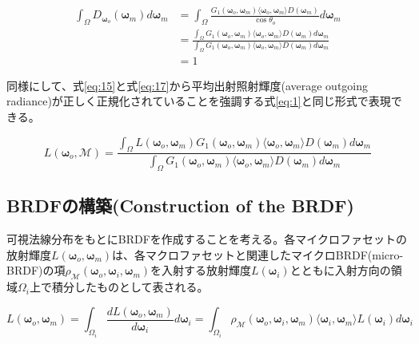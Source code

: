 \documentclass[a4j,xelatex,ja=standard]{bxjsarticle}
\begin{document}
\begin{equation}
    \begin{split}
        \int_\Omega D_{\boldsymbol{\omega}_o}(\boldsymbol{\omega}_m) d\boldsymbol{\omega}_m
        &= \int_\Omega \frac{G_1(\boldsymbol{\omega}_o, \boldsymbol{\omega}_m) \langle \boldsymbol{\omega}_o, \boldsymbol{\omega}_m \rangle D(\boldsymbol{\omega}_m)}{\cos\theta_o} d\boldsymbol{\omega}_m \\
        &= \frac{\int_\Omega G_1(\boldsymbol{\omega}_o, \boldsymbol{\omega}_m) \langle \boldsymbol{\omega}_o, \boldsymbol{\omega}_m \rangle D(\boldsymbol{\omega}_m) d\boldsymbol{\omega}_m}{\int_\Omega G_1(\boldsymbol{\omega}_o, \boldsymbol{\omega}_m) \langle \boldsymbol{\omega}_o, \boldsymbol{\omega}_m \rangle D(\boldsymbol{\omega}_m)d \boldsymbol{\omega}_m} \\
        &= 1
    \end{split}
    \label{eq:18}
\end{equation}

同様にして、式\eqref{eq:15}と式\eqref{eq:17}から平均出射照射輝度(average outgoing radiance)が正しく正規化されていることを強調する式\eqref{eq:1}と同じ形式で表現できる。

\begin{equation}
    L(\boldsymbol{\omega}_o, \mathcal{M}) = \frac{\int_\Omega L(\boldsymbol{\omega}_o, \boldsymbol{\omega}_m) G_1(\boldsymbol{\omega}_o, \boldsymbol{\omega}_m) \langle \boldsymbol{\omega}_o, \boldsymbol{\omega}_m \rangle D(\boldsymbol{\omega}_m) d \boldsymbol{\omega}_m}{\int_\Omega G_1(\boldsymbol{\omega}_o, \boldsymbol{\omega}_m) \langle \boldsymbol{\omega}_o, \boldsymbol{\omega}_m \rangle D(\boldsymbol{\omega}_m)d \boldsymbol{\omega}_m}
    \label{eq:19}
\end{equation}

\subsection{BRDFの構築(Construction of the BRDF)}
\label{sec:3.2}

可視法線分布をもとにBRDFを作成することを考える。各マイクロファセットの放射輝度$L(\boldsymbol{\omega}_o, \boldsymbol{\omega}_m)$は、各マクロファセットと関連したマイクロBRDF(micro-BRDF)の項$\rho_{\mathcal M}(\boldsymbol{\omega}_o, \boldsymbol{\omega}_i, \boldsymbol{\omega}_m)$を入射する放射輝度$L(\boldsymbol{\omega}_i)$とともに入射方向の領域$\Omega_i$上で積分したものとして表される。

\begin{equation}
    L(\boldsymbol{\omega}_o, \boldsymbol{\omega}_m) = \int_{\Omega_i} \frac{dL(\boldsymbol{\omega}_o, \boldsymbol{\omega}_m)}{d\boldsymbol{\omega}_i} d\boldsymbol{\omega}_i = \int_{\Omega_i} \rho_{\mathcal M}(\boldsymbol{\omega}_o, \boldsymbol{\omega}_i, \boldsymbol{\omega}_m) \langle \boldsymbol{\omega}_i, \boldsymbol{\omega}_m \rangle L(\boldsymbol{\omega}_i) d\boldsymbol{\omega}_i
    \label{eq:20}
\end{equation}
\end{document}
